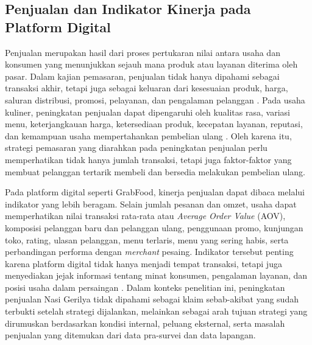 \subsection{Penjualan dan Indikator Kinerja pada Platform Digital}
Penjualan merupakan hasil dari proses pertukaran nilai antara usaha dan konsumen yang menunjukkan sejauh mana produk atau layanan diterima oleh pasar. Dalam kajian pemasaran, penjualan tidak hanya dipahami sebagai transaksi akhir, tetapi juga sebagai keluaran dari kesesuaian produk, harga, saluran distribusi, promosi, pelayanan, dan pengalaman pelanggan \parencite{kotler2023principlesmarketing,wirtz2024servicesmarketing}. Pada usaha kuliner, peningkatan penjualan dapat dipengaruhi oleh kualitas rasa, variasi menu, keterjangkauan harga, ketersediaan produk, kecepatan layanan, reputasi, dan kemampuan usaha mempertahankan pembelian ulang \parencite{regina2025kuliner,sophia2025rendanggadih}. Oleh karena itu, strategi pemasaran yang diarahkan pada peningkatan penjualan perlu memperhatikan tidak hanya jumlah transaksi, tetapi juga faktor-faktor yang membuat pelanggan tertarik membeli dan bersedia melakukan pembelian ulang.

Pada platform digital seperti GrabFood, kinerja penjualan dapat dibaca melalui indikator yang lebih beragam. Selain jumlah pesanan dan omzet, usaha dapat memperhatikan nilai transaksi rata-rata atau \textit{Average Order Value} (AOV), komposisi pelanggan baru dan pelanggan ulang, penggunaan promo, kunjungan toko, rating, ulasan pelanggan, menu terlaris, menu yang sering habis, serta perbandingan performa dengan \textit{merchant} pesaing. Indikator tersebut penting karena platform digital tidak hanya menjadi tempat transaksi, tetapi juga menyediakan jejak informasi tentang minat konsumen, pengalaman layanan, dan posisi usaha dalam persaingan \parencite{chaffey2022digitalmarketing,khairani2022buahsayur,suharjo2020bogorsnacks}. Dalam konteks penelitian ini, peningkatan penjualan Nasi Gerilya tidak dipahami sebagai klaim sebab-akibat yang sudah terbukti setelah strategi dijalankan, melainkan sebagai arah tujuan strategi yang dirumuskan berdasarkan kondisi internal, peluang eksternal, serta masalah penjualan yang ditemukan dari data pra-survei dan data lapangan.

